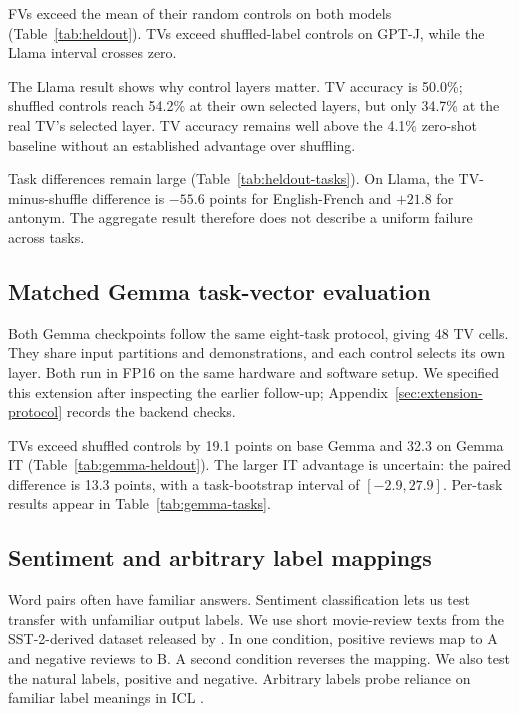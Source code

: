 \documentclass[11pt]{article}
\begin{document}
FVs exceed the mean of their random controls on both models (Table~\ref{tab:heldout}). TVs exceed shuffled-label controls on GPT-J, while the Llama interval crosses zero.

The Llama result shows why control layers matter. TV accuracy is 50.0\%; shuffled controls reach 54.2\% at their own selected layers, but only 34.7\% at the real TV's selected layer. TV accuracy remains well above the 4.1\% zero-shot baseline without an established advantage over shuffling.

Task differences remain large (Table~\ref{tab:heldout-tasks}). On Llama, the TV-minus-shuffle difference is $-55.6$ points for English-French and $+21.8$ for antonym. The aggregate result therefore does not describe a uniform failure across tasks.

\subsection{Matched Gemma task-vector evaluation}
\label{sec:gemma-heldout}

Both Gemma checkpoints follow the same eight-task protocol, giving 48 TV cells. They share input partitions and demonstrations, and each control selects its own layer. Both run in FP16 on the same hardware and software setup. We specified this extension after inspecting the earlier follow-up; Appendix~\ref{sec:extension-protocol} records the backend checks.

\begin{table}[t]
  \centering
  \scriptsize
  \setlength{\tabcolsep}{3pt}
  
  \caption{Held-out Gemma TV accuracy (\%). $\Delta$: TV minus independently selected shuffled controls (percentage points); 95\% CIs bootstrap tasks.}
  \label{tab:gemma-heldout}
\end{table}

TVs exceed shuffled controls by 19.1 points on base Gemma and 32.3 on Gemma IT (Table~\ref{tab:gemma-heldout}). The larger IT advantage is uncertain: the paired difference is 13.3 points, with a task-bootstrap interval of $[-2.9,27.9]$. Per-task results appear in Table~\ref{tab:gemma-tasks}.

\subsection{Sentiment and arbitrary label mappings}
\label{sec:sentiment}

Word pairs often have familiar answers. Sentiment classification lets us test transfer with unfamiliar output labels. We use short movie-review texts from the SST-2-derived dataset released by \citet{todd2024function}. In one condition, positive reviews map to A and negative reviews to B. A second condition reverses the mapping. We also test the natural labels, positive and negative. Arbitrary labels probe reliance on familiar label meanings in ICL \citep{wei2023larger}.
\end{document}
